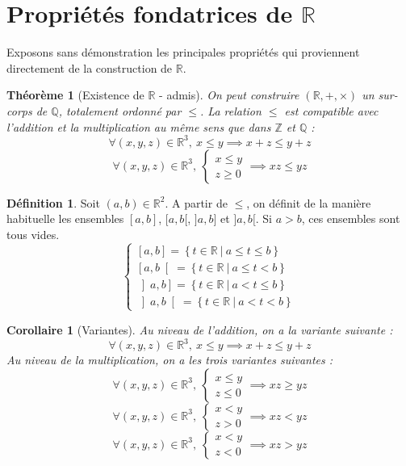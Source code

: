 \documentclass[french]{book}
\newcommand{\Z}{\mathbb{Z}}
\newcommand{\Q}{\mathbb{Q}}
\newcommand{\R}{\mathbb{R}}
\theoremstyle{plain}
\newtheorem{thm}{Théorème}[chapter]
\newtheorem{cor}{Corollaire}[chapter]
\theoremstyle{definition}
\newtheorem{dfn}{Définition}[chapter]
\theoremstyle{remark}
\begin{document}
\section{Propriétés fondatrices de $\R$}
Exposons sans démonstration les principales propriétés qui proviennent directement de la construction de $\R$.
\begin{thm}[Existence de $\R$ - admis]
	On peut construire $(\R,+,\times)$ un sur-corps de $\Q$, totalement ordonné par $\leqslant$. La relation $\leqslant$ est compatible avec l'addition et la multiplication au même sens que dans $\Z$ et $\Q$ : $$\forall(x,y,z)\in\R^3,\ x\leqslant y \implies x+z\leqslant y+z$$ $$\forall(x,y,z)\in\R^3,\ \left \{\begin{array}{ll}x\leqslant y \\ z\geqslant 0\end{array}\right. \implies xz\leqslant yz$$
\end{thm}
\begin{dfn}
	Soit $(a,b)\in\R^2$. A partir de $\leqslant$, on définit de la manière habituelle les ensembles $[a,b]$, $[a,b[$, $]a,b]$ et $]a,b[$. Si $a>b$, ces ensembles sont tous vides. $$\left \{ \begin{array}{llll} \left[a,b\right]=\left\{t\in\R \ | \ a\leqslant t\leqslant b\right\} \\ \left[a,b\right[=\left\{t\in\R \ | \ a\leqslant t< b\right\} \\ \left]a,b\right]=\left\{t\in\R \ | \ a<t\leqslant b\right\} \\ \left]a,b\right[=\left\{t\in\R \ | \ a<t< b\right\}\end{array}\right.$$
\end{dfn}
\begin{cor}[Variantes]
	Au niveau de l'addition, on a la variante suivante : $$\forall(x,y,z)\in\R^3,\ x\leqslant y \implies x+z\leqslant y+z$$ Au niveau de la multiplication, on a les trois variantes suivantes : $$\forall(x,y,z)\in\R^3,\ \left \{\begin{array}{ll}x\leqslant y \\ z\leqslant 0\end{array}\right. \implies xz\geqslant yz$$ $$\forall(x,y,z)\in\R^3,\ \left \{\begin{array}{ll}x<y \\ z>0\end{array}\right. \implies xz<yz$$ $$\forall(x,y,z)\in\R^3,\ \left \{\begin{array}{ll}x<y \\ z<0\end{array}\right. \implies xz>yz$$
\end{cor}
\end{document}
